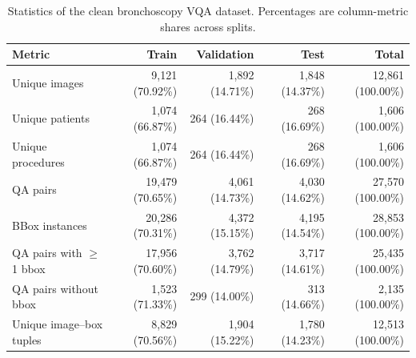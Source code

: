 \begin{table}[t]
\centering
\caption{Statistics of the clean bronchoscopy VQA dataset. Percentages are column-metric shares across splits.}
\label{tab:dataset_statistics}
\begin{tabular}{lrrrr}
\toprule
Metric & Train & Validation & Test & Total \\
\midrule
Unique images & 9,121 (70.92\%) & 1,892 (14.71\%) & 1,848 (14.37\%) & 12,861 (100.00\%) \\
Unique patients & 1,074 (66.87\%) & 264 (16.44\%) & 268 (16.69\%) & 1,606 (100.00\%) \\
Unique procedures & 1,074 (66.87\%) & 264 (16.44\%) & 268 (16.69\%) & 1,606 (100.00\%) \\
QA pairs & 19,479 (70.65\%) & 4,061 (14.73\%) & 4,030 (14.62\%) & 27,570 (100.00\%) \\
BBox instances & 20,286 (70.31\%) & 4,372 (15.15\%) & 4,195 (14.54\%) & 28,853 (100.00\%) \\
QA pairs with $\geq$1 bbox & 17,956 (70.60\%) & 3,762 (14.79\%) & 3,717 (14.61\%) & 25,435 (100.00\%) \\
QA pairs without bbox & 1,523 (71.33\%) & 299 (14.00\%) & 313 (14.66\%) & 2,135 (100.00\%) \\
Unique image--box tuples & 8,829 (70.56\%) & 1,904 (15.22\%) & 1,780 (14.23\%) & 12,513 (100.00\%) \\
\bottomrule
\end{tabular}
\end{table}

